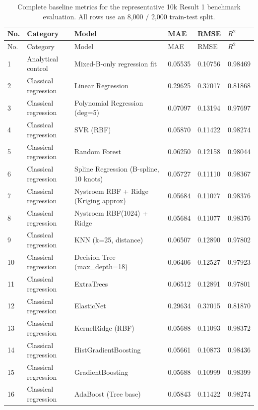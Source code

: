 \documentclass[10pt]{article}
\begin{document}
\begingroup
\footnotesize
\setlength{\tabcolsep}{2.2pt}
\renewcommand{\arraystretch}{1.08}
\begin{longtable}{C{0.75cm}L{2.35cm}L{8.0cm}C{1.15cm}C{1.15cm}C{1.15cm}}
\caption{Complete baseline metrics for the representative 10k Result 1 benchmark evaluation. All rows use an 8,000 / 2,000 train-test split.}
\label{tab:complete-baseline-metrics-result1}\\
\toprule
No. & Category & Model & MAE & RMSE & $R^2$ \\
\midrule
\endfirsthead
\toprule
No. & Category & Model & MAE & RMSE & $R^2$ \\
\midrule
{} & Analytical control & Mixed-B-only regression fit & 0.05535 & 0.10756 & 0.98469 \\
2 & Classical regression & Linear Regression & 0.29625 & 0.37017 & 0.81868 \\
3 & Classical regression & Polynomial Regression (deg=5) & 0.07097 & 0.13194 & 0.97697 \\
4 & Classical regression & SVR (RBF) & 0.05870 & 0.11422 & 0.98274 \\
5 & Classical regression & Random Forest & 0.06250 & 0.12158 & 0.98044 \\
6 & Classical regression & Spline Regression (B-spline, 10 knots) & 0.05727 & 0.11110 & 0.98367 \\
7 & Classical regression & Nystroem RBF + Ridge (Kriging approx) & 0.05684 & 0.11077 & 0.98376 \\
8 & Classical regression & Nystroem RBF(1024) + Ridge & 0.05684 & 0.11077 & 0.98376 \\
9 & Classical regression & KNN (k=25, distance) & 0.06507 & 0.12890 & 0.97802 \\
10 & Classical regression & Decision Tree (max\_depth=18) & 0.06406 & 0.12527 & 0.97923 \\
11 & Classical regression & ExtraTrees & 0.06512 & 0.12891 & 0.97801 \\
12 & Classical regression & ElasticNet & 0.29634 & 0.37015 & 0.81870 \\
13 & Classical regression & KernelRidge (RBF) & 0.05688 & 0.11093 & 0.98372 \\
14 & Classical regression & HistGradientBoosting & 0.05661 & 0.10873 & 0.98436 \\
15 & Classical regression & GradientBoosting & 0.05688 & 0.10999 & 0.98399 \\
16 & Classical regression & AdaBoost (Tree base) & 0.05843 & 0.11422 & 0.98274 \\

\end{longtable}
\end{document}
